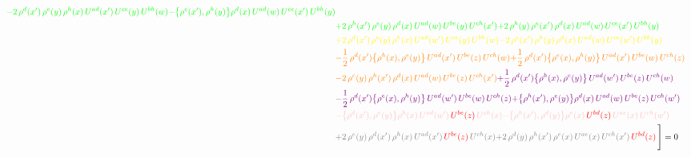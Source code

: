 \documentclass[9pt]{article}
\numberwithin{equation}{section}
\begin{document}
\begin{align}
{\color{green}-2\,\rho^{d}(x')\,\rho^{e}(y)\,\rho^{h}(x)\,U^{ad}(x')\,U^{ce}(y)\,U^{bh}(w)}{\color{green}-\big\{\rho^{e}(x'),\rho^{h}(y)\big\}\rho^{d}(x)\,U^{ad}(w)\,U^{ce}(x')\,U^{bh}(y)}\notag \\ & {\color{green}+2\,\rho^{h}(x')\,\rho^{e}(y)\,\rho^{d}(x)\,U^{ad}(w)\,U^{be}(y)\,U^{ch}(x')}{\color{green}+2\,\rho^{h}(y)\,\rho^{e}(x')\,\rho^{d}(x)\,U^{ad}(w)\,U^{ce}(x')\,U^{bh}(y)}\notag \\ & {\color{yellow}+2\,\rho^{d}(x')\,\rho^{e}(y)\,\rho^{h}(x)\,U^{ad}(w')\,U^{ce}(y)\,U^{bh}(w)}{\color{yellow}-2\,\rho^{e}(x')\,\rho^{h}(y)\,\rho^{d}(x)\,U^{ad}(w)\,U^{ce}(w')\,U^{bh}(y)}\notag \\ & {\color{orange}-\frac{1}{2}\,\rho^{d}(x')\big\{\rho^{h}(x),\rho^{e}(y)\big\}\,U^{ad}(x')\,U^{be}(z)\,U^{ch}(w)}{\color{orange}+\frac{1}{2}\,\rho^{d}(x')\big\{\rho^{e}(x),\rho^{h}(y)\big\}\,U^{ad}(x')\,U^{be}(w)\,U^{ch}(z)}\notag \\
&{\color{orange}-2\,\rho^{e}(y)\,\rho^{h}(x')\,\rho^{d}(x)\,U^{ad}(w)\,U^{be}(z)\,U^{ch}(x')}{\color{violet}+\frac{1}{2}\,\rho^{d}(x')\big\{\rho^{h}(x),\rho^{e}(y)\big\}\,U^{ad}(w')\,U^{be}(z)\,U^{ch}(w)}\notag \\ & {\color{violet}-\frac{1}{2}\,\rho^{d}(x')\big\{\rho^{e}(x),\rho^{h}(y)\big\}\,U^{ad}(w')\,U^{be}(w)\,U^{ch}(z)}{\color{violet}+\big\{\rho^{h}(x'),\rho^{e}(y)\big\}\rho^{d}(x)\,U^{ad}(w)\,U^{be}(z)\,U^{ch}(w')}\notag \\ &{\color{pink}-\big\{\rho^{d}(x'),\rho^{e}(y)\big\}\rho^{h}(x)\,U^{ad}(w')\,{\color{red}U^{be}(z)}\,U^{ch}(x)}{\color{pink}-\big\{\rho^{h}(x'),\rho^{d}(y)\big\}\rho^{e}(x)\,{\color{red}U^{bd}(z)}\,U^{ae}(x)\,U^{ch}(w')}\notag \\ &{\color{gray}+2\,\rho^{e}(y)\,\rho^{d}(x')\, \rho^{h}(x)\, U^{ad}(x')\,{\color{red}U^{be}(z)}\,U^{ch}(x)}{\color{gray}+2\,\rho^{d}(y)\,\rho^{h}(x')\,\rho^{e}(x)\,U^{ae}(x)\,U^{ch}(x')\,{\color{red}U^{bd}(z)}}\,\Bigg] = 0
\end{align}    
\end{document}
